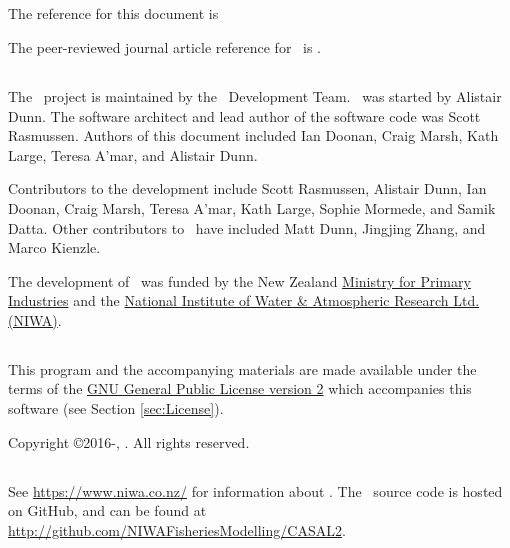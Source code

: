 \subsection{}

The reference for this document is \ManualRef

The peer-reviewed journal article reference for \CNAME\ is \citep{doonan_casal2}.

\subsection{}

The \CNAME\ project is maintained by the \CNAME\ Development Team. \CNAME\ was started by Alistair Dunn. The software architect and lead author of the software code was Scott Rasmussen. Authors of this document included Ian Doonan, Craig Marsh, Kath Large, Teresa A'mar, and Alistair Dunn.

Contributors to the development include Scott Rasmussen, Alistair Dunn, Ian Doonan, Craig Marsh, Teresa A'mar, Kath Large, Sophie Mormede, and Samik Datta. Other contributors to \CNAME\ have included Matt Dunn, Jingjing Zhang, and Marco Kienzle. 

The development of \CNAME\ was funded by the New Zealand \href{http://www.mpi.govt.nz}{Ministry for Primary Industries} and the \href{http://www.niwa.co.nz}{National Institute of Water \& Atmospheric Research Ltd. (NIWA)}.

\subsection{}

This program and the accompanying materials are made available under the terms of the \href{http://www.opensource.org/licenses/GPL-2.0}{GNU General Public License version 2} which accompanies this software (see Section \ref{sec:License}).

Copyright \copyright 2016-\SourceControlYearDoc, \href{https://www.niwa.co.nz}{\Organisation}. All rights reserved.

\subsection{}

See \url{https://www.niwa.co.nz/} for information about \CNAME. The \CNAME\ source code is hosted on GitHub, and can be found at \url{http://github.com/NIWAFisheriesModelling/CASAL2}.

